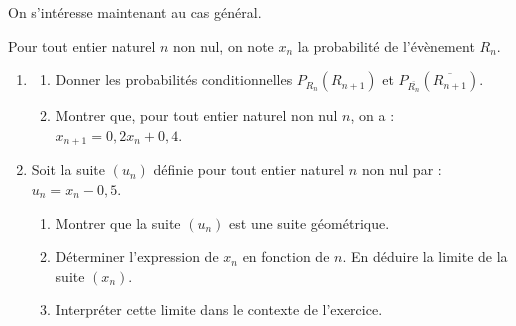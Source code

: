 On s'intéresse maintenant au cas général.

Pour tout entier naturel $n$ non nul, on note $x_{n}$ la probabilité de l'évènement $R_{n}$.

\begin{enumerate}
	\item \begin{enumerate}
		\item Donner les probabilités conditionnelles $P_{R_{n}}\left(R_{n + 1}\right)$ et $P_{\overline{R_{n}}}\left(\overline{R_{n + 1}}\right)$.

		\item Montrer que, pour tout entier naturel non nul $n$, on a : $x_{n + 1}=0,2 x_{n} + 0,4$.
	\end{enumerate}

	\item Soit la suite $\left(u_{n}\right)$ définie pour tout entier naturel $n$ non nul par :\quad $u_{n}=x_{n}-0,5$.

	\begin{enumerate}
		\item Montrer que la suite $\left(u_{n}\right)$ est une suite géométrique.
		\item Déterminer l'expression de $x_{n}$ en fonction de $n$. En déduire la limite de la suite $\left(x_{n}\right)$.
		\item Interpréter cette limite dans le contexte de l'exercice.
	\end{enumerate}
\end{enumerate}
